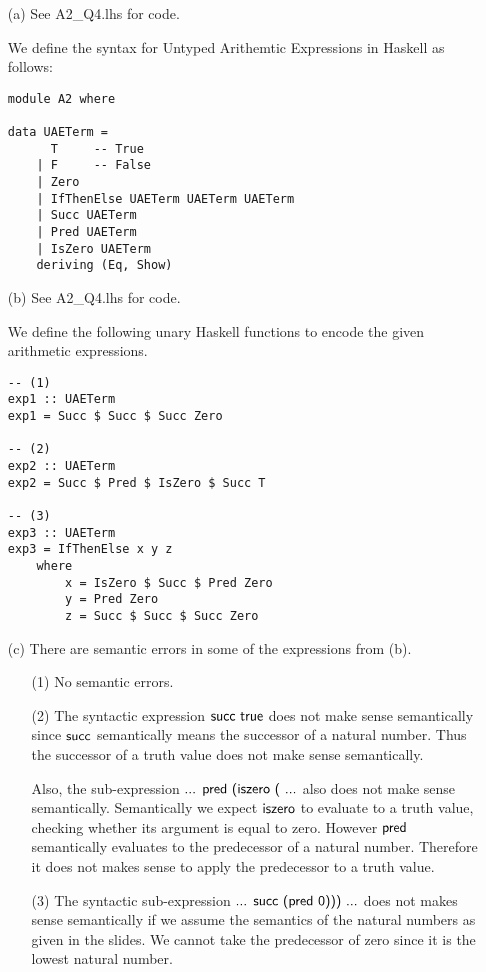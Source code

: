 \documentclass[12pt, fleqn]{article}
\begin{document}
\begin{enumerate}

\item[(a)] See A2\_Q4.lhs for code.

We define the syntax for Untyped Arithemtic Expressions in Haskell as follows:
\begin{verbatim}
module A2 where

data UAETerm = 
      T     -- True
    | F     -- False
    | Zero
    | IfThenElse UAETerm UAETerm UAETerm
    | Succ UAETerm
    | Pred UAETerm
    | IsZero UAETerm
    deriving (Eq, Show)
\end{verbatim}

\item[(b)] See A2\_Q4.lhs for code.

We define the following unary Haskell functions to encode the given arithmetic expressions.

\begin{verbatim}
-- (1)
exp1 :: UAETerm
exp1 = Succ $ Succ $ Succ Zero

-- (2)
exp2 :: UAETerm
exp2 = Succ $ Pred $ IsZero $ Succ T

-- (3)
exp3 :: UAETerm
exp3 = IfThenElse x y z
    where
        x = IsZero $ Succ $ Pred Zero
        y = Pred Zero
        z = Succ $ Succ $ Succ Zero
\end{verbatim}

\item[(c)]
There are semantic errors in some of the expressions from (b).

\begin{enumerate}
\item[(1)] No semantic errors.
\item[(2)] The syntactic expression $\mbox{\sf succ true}$ does not make sense semantically since $\mbox{\sf succ}$
semantically means the successor of a natural number. Thus the successor of a truth value does not make sense semantically.

Also, the sub-expression $\mbox{\sf ... pred (iszero ( ...}$ also does not make sense semantically. Semantically we expect $\mbox{\sf iszero}$ to evaluate
to a truth value, checking whether its argument is equal to zero. However $\mbox{\sf pred}$ semantically evaluates to the predecessor of a natural
number. Therefore it does not makes sense to apply the predecessor to a truth value.

\item[(3)] The syntactic sub-expression $\mbox{\sf ... succ (pred 0))) ...}$ does not makes sense semantically if we assume the semantics of the natural
numbers as given in the slides. We cannot take the predecessor of zero since it is the lowest natural number.


\end{enumerate}
\end{enumerate}
\end{document}
